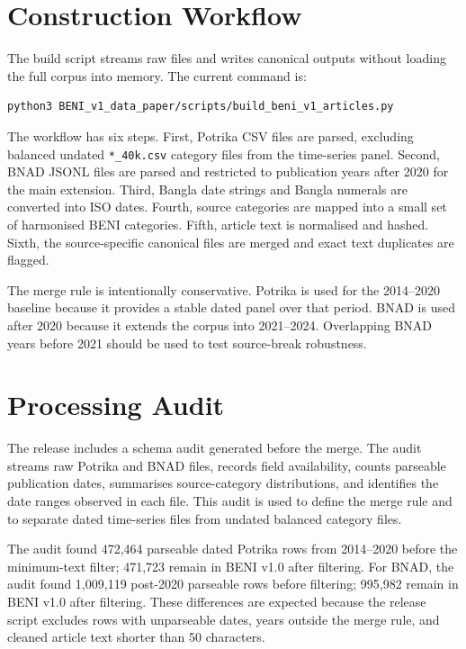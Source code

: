 \documentclass[11pt]{article}
\begin{document}
\section{Construction Workflow}

The build script streams raw files and writes canonical outputs without loading the full corpus into memory. The current command is:

\begin{verbatim}
python3 BENI_v1_data_paper/scripts/build_beni_v1_articles.py
\end{verbatim}

The workflow has six steps. First, Potrika CSV files are parsed, excluding balanced undated \texttt{*\_40k.csv} category files from the time-series panel. Second, BNAD JSONL files are parsed and restricted to publication years after 2020 for the main extension. Third, Bangla date strings and Bangla numerals are converted into ISO dates. Fourth, source categories are mapped into a small set of harmonised BENI categories. Fifth, article text is normalised and hashed. Sixth, the source-specific canonical files are merged and exact text duplicates are flagged.

The merge rule is intentionally conservative. Potrika is used for the 2014--2020 baseline because it provides a stable dated panel over that period. BNAD is used after 2020 because it extends the corpus into 2021--2024. Overlapping BNAD years before 2021 should be used to test source-break robustness.

\section{Processing Audit}

The release includes a schema audit generated before the merge. The audit streams raw Potrika and BNAD files, records field availability, counts parseable publication dates, summarises source-category distributions, and identifies the date ranges observed in each file. This audit is used to define the merge rule and to separate dated time-series files from undated balanced category files.

The audit found 472,464 parseable dated Potrika rows from 2014--2020 before the minimum-text filter; 471,723 remain in BENI v1.0 after filtering. For BNAD, the audit found 1,009,119 post-2020 parseable rows before filtering; 995,982 remain in BENI v1.0 after filtering. These differences are expected because the release script excludes rows with unparseable dates, years outside the merge rule, and cleaned article text shorter than 50 characters.
\end{document}
